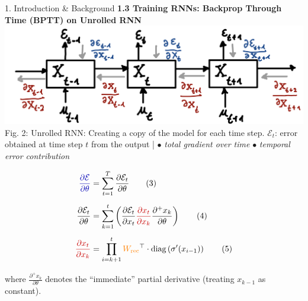 \begin{frame}[t]
\begin{columns}[t,totalwidth=\textwidth]
\begin{column}{0.3\textwidth}
\begin{block}{1. Introduction \& Background}
        \vspace{1em}
        \textbf{1.3 Training RNNs: Backprop Through Time (BPTT) on Unrolled RNN}\\
        \includegraphics[width=0.95\linewidth]{figures/2_fig.png}\\[0.5em]
         Fig. 2: Unrolled RNN: Creating a copy of the model for each time step. \textcolor{myblue}{$\mathcal{E}_t$:}  error obtained at time step $t$ from the output |
          $\bullet$ \textcolor{myblue}{ \textit{total gradient over time}}
        \quad
        $\bullet$ \textcolor{myred}{ \textit{temporal error contribution}}


        \vspace{0.3em}
        \begin{align*}
          \textcolor{myblue}{\frac{\partial \mathcal{E}}{\partial \theta}} &=
          \sum_{t=1}^{T} \frac{\partial \mathcal{E}_t}{\partial \theta} \hspace{2em} \text{(3)} \\[0.5em]
          \frac{\partial \mathcal{E}_t}{\partial \theta} &=
          \sum_{k=1}^{t} 
          \left( {\frac{\partial \mathcal{E}_t}{\partial x_t}} 
          \textcolor{myred}{\frac{\partial x_t}{\partial x_k}}
          \frac{\partial^+ x_k}{\partial \theta} \right) \hspace{2em} \text{(4)} \\[0.5em]
          \textcolor{myred}{\frac{\partial x_t}{\partial x_k}} &=
          \prod_{i=k+1}^{t}
          \textcolor{orange}{W_{\text{rec}}}^\top \cdot \text{diag}\left(\sigma'(x_{i-1})\right) \hspace{2em} \text{(5)}
        \end{align*}
        
        \vspace{0.5em}
        where $\frac{\partial^+ x_k}{\partial \theta}$ denotes the “immediate” partial derivative (treating $x_{k-1}$ as constant).
        
        \vspace{0.5em}


\end{block}
\end{column}
\end{columns}
\end{frame}
